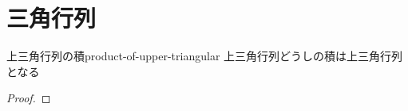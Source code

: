 \documentclass[../../../topic_linear-algebra]{subfiles}
\begin{document}
\sectionline
\section{三角行列}

\begin{theorem}{上三角行列の積}{product-of-upper-triangular}
  上三角行列どうしの積は上三角行列となる
\end{theorem}

\begin{proof}
  \todo{}
\end{proof}
\end{document}
